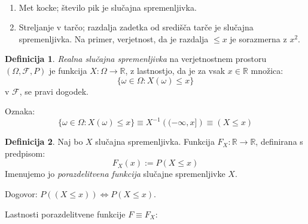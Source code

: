 \documentclass[12pt]{book}
\def\n{\noindent}
\theoremstyle{definition}
\newtheorem{definicija}{Definicija}
\theoremstyle{plain}
\theoremstyle{plain}
\theoremstyle{plain}
\theoremstyle{remark}
\begin{document}
\begin{zgled}
    ~

    \begin{enumerate} 
        \item Met kocke; število pik je slučajna spremenljivka.
        \item Streljanje v tarčo; razdalja zadetka od središča tarče je slučajna spremenljivka. 
        Na primer, verjetnost, da je razdalja $\leq x$ je sorazmerna z $x^2$.
    \end{enumerate}
\end{zgled}

\begin{definicija}
    \emph{Realna slučajna spremenljivka} na verjetnostnem prostoru $(\Omega, \mathcal{F}, P)$ je funkcija $X: \Omega \to \mathbb{R}$, z lastnostjo, da je za vsak $x \in \mathbb{R}$ množica:
    $$
    \{\omega \in \Omega: X(\omega) \leq x\}
    $$
    v $\mathcal{F}$, se pravi dogodek.
\end{definicija}

\n Oznaka: 
$$
\{\omega \in \Omega: X(\omega) \leq x\} \equiv X^{-1}\left((-\infty, x]\right) \equiv (X \leq x)
$$

\begin{definicija}
    Naj bo $X$ slučajna spremenljivka. Funkcija $F_X: \mathbb{R} \to \mathbb{R}$, definirana s predpisom: 
    $$
    F_X(x):=P(X \leq x)
    $$
    Imenujemo jo \emph{porazdelitvena funkcija} slučajne spremenljivke $X$.
\end{definicija}

\n Dogovor: $P((X \leq x)) \iff P(X \leq x)$.

\newpage

\n Lastnosti porazdelitvene funkcije $F \equiv F_X$:
\end{document}
